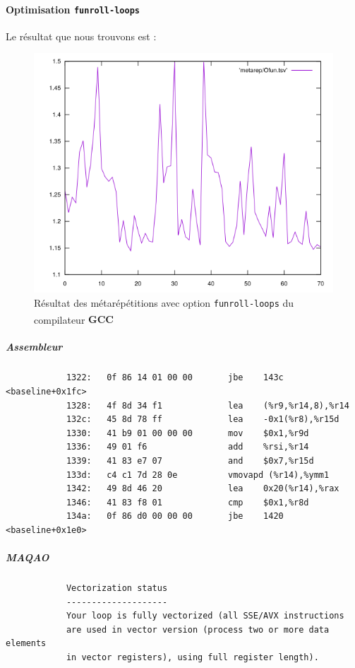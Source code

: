 \documentclass{report}
\begin{document}
	      \paragraph{Optimisation \texttt{funroll-loops}}
        Le résultat que nous trouvons est :
        \begin{figure}[ht!]
          \centering
          \includegraphics[scale=0.45]{resources/L1/metarep/Ofun.png}
          \caption{Résultat des métarépétitions avec option \texttt{funroll-loops} du compilateur \textbf{GCC\textsuperscript \textcopyleft  }}
        \end{figure}
        \subparagraph{Assembleur}
          \begin{verbatim}
            1322:	0f 86 14 01 00 00    	jbe    143c <baseline+0x1fc>
            1328:	4f 8d 34 f1          	lea    (%r9,%r14,8),%r14
            132c:	45 8d 78 ff          	lea    -0x1(%r8),%r15d
            1330:	41 b9 01 00 00 00    	mov    $0x1,%r9d
            1336:	49 01 f6             	add    %rsi,%r14
            1339:	41 83 e7 07          	and    $0x7,%r15d
            133d:	c4 c1 7d 28 0e       	vmovapd (%r14),%ymm1
            1342:	49 8d 46 20          	lea    0x20(%r14),%rax
            1346:	41 83 f8 01          	cmp    $0x1,%r8d
            134a:	0f 86 d0 00 00 00    	jbe    1420 <baseline+0x1e0>
          \end{verbatim}
        \subparagraph{MAQAO}
          \begin{verbatim}
            Vectorization status
            --------------------
            Your loop is fully vectorized (all SSE/AVX instructions
            are used in vector version (process two or more data elements
            in vector registers), using full register length).
          \end{verbatim}
      \newpage
\end{document}
